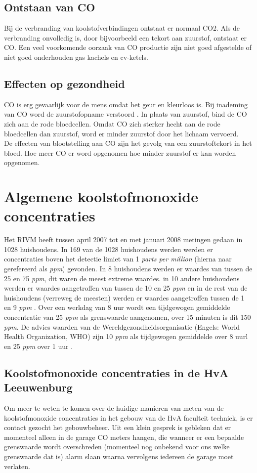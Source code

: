 \documentclass[a4paper, 11pt]{article} %
\begin{document}
\subsection{Ontstaan van CO}
Bij de verbranding van koolstofverbindingen ontstaat er normaal CO2. Als de verbranding onvolledig is, door bijvoorbeeld een tekort aan zuurstof, ontstaat er CO. Een veel voorkomende oorzaak van CO productie zijn niet goed afgestelde of niet goed onderhouden gas kachels en cv-ketels.

\subsection{Effecten op gezondheid}
CO is erg gevaarlijk voor de mens omdat het geur en kleurloos is. Bij inademing van CO word de zuurstofopname verstoord \cite{EffectenKoolmonoxide}. In plaats van zuurstof, bind de CO zich aan de rode bloedcellen. Omdat CO zich sterker hecht aan de rode bloedcellen dan zuurstof, word er minder zuurstof door het lichaam vervoerd. 
\\
De effecten van blootstelling aan CO zijn het gevolg van een zuurstoftekort in het bloed. Hoe meer CO er word opgenomen hoe minder zuurstof er kan worden opgenomen. 

\section{Algemene koolstofmonoxide concentraties}
Het RIVM heeft tussen april 2007 tot en met januari 2008 metingen gedaan in 1028 huishoudens. In 169 van de 1028 huishoudens werden werden er concentraties boven het detectie limiet van 1 \textit{parts per million} (hierna naar gerefereerd als \textit{ppm}) gevonden. In 8 huishoudens werden er waardes van tussen de 25 en 75 \textit{ppm}, dit waren de meest extreme waardes. in 10 andere huishoudens werden er waardes aangetroffen van tussen de 10 en 25 \textit{ppm} en in de rest van de huishoudens (verreweg de meesten) werden er waardes aangetroffen tussen de 1 en 9 \textit{ppm} \cite{RIVMhuurwoningen}. Over een werkdag van 8 uur wordt een tijdgewogen gemiddelde concentratie van 25 \textit{ppm} als grenswaarde aangenomen, over 15 minuten is dit 150 \textit{ppm}. De advies waarden van de Wereldgezondheidsorganisatie (Engels: World Health Organization, WHO) zijn 10 \textit{ppm} als tijdgewogen gemiddelde over 8 uurl en 25 \textit{ppm} over 1 uur \cite{BlootstellingaanCO}.
\subsection{Koolstofmonoxide concentraties in de HvA Leeuwenburg}
Om meer te weten te komen over de huidige manieren van meten van de koolstofmonoxide concentraties in het gebouw van de HvA faculteit techniek, is er contact gezocht het gebouwbeheer. Uit een klein gesprek is gebleken dat er momenteel alleen in de garage CO meters hangen, die wanneer er een bepaalde grenswaarde wordt overschreden (momenteel nog onbekend voor ons welke grenswaarde dat is) alarm slaan waarna vervolgens iedereen de garage moet verlaten.
\end{document}
